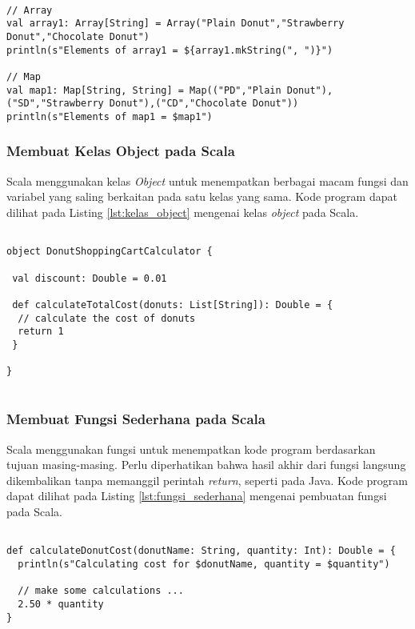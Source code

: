 \begin{lstlisting}[basicstyle=\ttfamily, frame=single,
	columns=fullflexible, keepspaces=true, breaklines=true, label=lst:mutable_collection, caption=Membuat mutable collection pada Scala]
	
// Array
val array1: Array[String] = Array("Plain Donut","Strawberry Donut","Chocolate Donut")
println(s"Elements of array1 = ${array1.mkString(", ")}")

// Map
val map1: Map[String, String] = Map(("PD","Plain Donut"),("SD","Strawberry Donut"),("CD","Chocolate Donut"))
println(s"Elements of map1 = $map1")

\end{lstlisting}

\subsubsection{Membuat Kelas Object pada Scala}
Scala menggunakan kelas \textit{Object} untuk menempatkan berbagai macam fungsi dan variabel yang saling berkaitan pada satu kelas yang sama. Kode program dapat dilihat pada Listing \ref{lst:kelas_object} mengenai kelas \textit{object} pada Scala.

\begin{lstlisting}[basicstyle=\ttfamily, frame=single,
	columns=fullflexible, keepspaces=true, breaklines=true, label=lst:kelas_object, caption=Membuat Kelas Object pada Scala]
	
object DonutShoppingCartCalculator {

 val discount: Double = 0.01

 def calculateTotalCost(donuts: List[String]): Double = {
  // calculate the cost of donuts
  return 1
 }
 
}
	
\end{lstlisting}

\newpage
\subsubsection{Membuat Fungsi Sederhana pada Scala}
Scala menggunakan fungsi untuk menempatkan kode program berdasarkan tujuan masing-masing. Perlu diperhatikan bahwa hasil akhir dari fungsi langsung dikembalikan tanpa memanggil perintah \textit{return}, seperti pada Java. Kode program dapat dilihat pada Listing \ref{lst:fungsi_sederhana} mengenai pembuatan fungsi pada Scala.

\begin{lstlisting}[basicstyle=\ttfamily, frame=single,
	columns=fullflexible, keepspaces=true, breaklines=true, label=lst:fungsi_sederhana, caption=Membuat Fungsi Sedehana pada Scala]
	
def calculateDonutCost(donutName: String, quantity: Int): Double = {
  println(s"Calculating cost for $donutName, quantity = $quantity")

  // make some calculations ...
  2.50 * quantity
}
	
\end{lstlisting}


